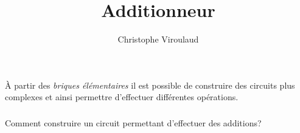 \documentclass[svgnames,11pt]{beamer}
\author[]{Christophe Viroulaud}
\title{Additionneur}
\date{\framebox{\textbf{Archi 06}}}
\institute{Première - NSI}
\begin{document}
\begin{frame}
    \titlepage
\end{frame}
\begin{frame}
    \frametitle{}

    À partir des \emph{briques élémentaires} il est possible de construire des circuits plus complexes et ainsi permettre d'effectuer différentes opérations.

\end{frame}
\begin{frame}
    \frametitle{}

    \begin{center}
        \begin{framed}
            Comment construire un circuit permettant d'effectuer des additions?
        \end{framed}
    \end{center}

\end{frame}
\end{document}
